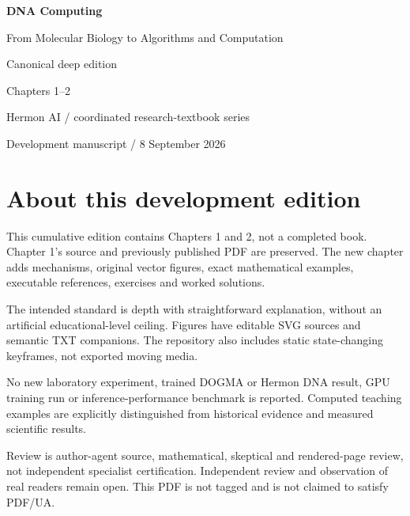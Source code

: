 \documentclass[11pt,oneside,openany]{book}
\begin{document}
\frontmatter
\begin{titlepage}
\color{BookBlue}\sffamily
\vspace*{18mm}
{\Huge\bfseries DNA Computing\par}
\vspace{8mm}
{\Large From Molecular Biology to Algorithms and Computation\par}
\vspace{20mm}
{\large Canonical deep edition\par}
\vspace{5mm}
{\LARGE Chapters 1--2\par}
\vfill
{\normalsize Hermon AI / coordinated research-textbook series\par}
\vspace{6mm}
{\small Development manuscript / 8 September 2026\par}
\end{titlepage}
\chapter*{About this development edition}
This cumulative edition contains Chapters 1 and 2, not a completed book. Chapter 1's source and previously published PDF are preserved. The new chapter adds mechanisms, original vector figures, exact mathematical examples, executable references, exercises and worked solutions.

The intended standard is depth with straightforward explanation, without an artificial educational-level ceiling. Figures have editable SVG sources and semantic TXT companions. The repository also includes static state-changing keyframes, not exported moving media.

No new laboratory experiment, trained DOGMA or Hermon DNA result, GPU training run or inference-performance benchmark is reported. Computed teaching examples are explicitly distinguished from historical evidence and measured scientific results.

Review is author-agent source, mathematical, skeptical and rendered-page review, not independent specialist certification. Independent review and observation of real readers remain open. This PDF is not tagged and is not claimed to satisfy PDF/UA.
\tableofcontents
\mainmatter


\backmatter



\clearpage{}
{}
\printindex
\end{document}
